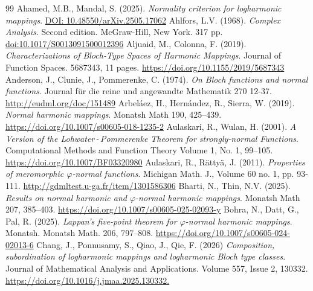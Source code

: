 \documentclass[10pt,a4paper]{amsart}
\numberwithin{equation}{section}
\begin{document}
\begin{thebibliography}{99}
 \label{ahamed-ncflm-2025} Ahamed, M.B., Mandal, S. (2025). \textit{Normality criterion for logharmonic mappings}. \url{DOI: 10.48550/arXiv.2505.17062}
 \label{ahlfors-ca-1968} Ahlfors, L.V. (1968). \textit{Complex Analysis}. Second edition. McGraw-Hill, New York. 317 pp. \url{doi:10.1017/S0013091500012396}
 \label{aljuain-cobtsohm-2019} Aljuaid, M., Colonna, F. (2019). \textit{Characterizations of Bloch-Type Spaces of Harmonic Mappings}. Journal of Function Spaces. 5687343, 11 pages. \url{https://doi.org/10.1155/2019/5687343}
 \label{anderson-obfanf-1974} Anderson, J., Clunie, J., Pommerenke, C. (1974). \textit{On Bloch functions and normal functions.} Journal für die reine und angewandte Mathematik 270 12-37. \url{http://eudml.org/doc/151489}
 \label{arbelaez-nhm-2019} Arbeláez, H., Hernández, R., Sierra, W. (2019). \textit{Normal harmonic mappings}. Monatsh Math 190, 425–439. \url{https://doi.org/10.1007/s00605-018-1235-2}
 \label{aulaskari-avotlptfsnf-2001} Aulaskari, R., Wulan, H. (2001). \textit{A Version of the Lohwater\,-\,Pommerenke Theorem for strongly-normal Functions}. Computational Methods and Function Theory Volume 1, No. 1, 99–105. \url{https://doi.org/10.1007/BF03320980}
 \label{aulaskari-pompnf-2011} Aulaskari, R., Rättyä, J. (2011). \textit{Properties of meromorphic $\varphi$-normal functions}. Michigan Math. J., Volume 60 no. 1, pp. 93-111. \url{http://gdmltest.u-ga.fr/item/1301586306}
 \label{bharti-ronhapnhm-2025} Bharti, N., Thin, N.V. (2025). \textit{Results on normal harmonic and $\varphi$-normal harmonic mappings}. Monatsh Math 207, 385–403. \url{https://doi.org/10.1007/s00605-025-02093-y}
 \label{bohra-lfptfpnhm-2025} Bohra, N., Datt, G., Pal, R. (2025). \textit{Lappan’s five-point theorem for $\varphi$-normal harmonic mappings}. Monatsh. Monatsh Math. 206, 797–808. \url{https://doi.org/10.1007/s00605-024-02013-6}
 \label{chang-csolmalbtc-2026} Chang, J., Ponnusamy, S., Qiao, J., Qie, F. (2026) \textit{Composition, subordination of logharmonic mappings and logharmonic Bloch type classes}. Journal of Mathematical Analysis and Applications. Volume 557, Issue 2, 130332. \url{https://doi.org/10.1016/j.jmaa.2025.130332.}

\end{thebibliography}
\end{document}
